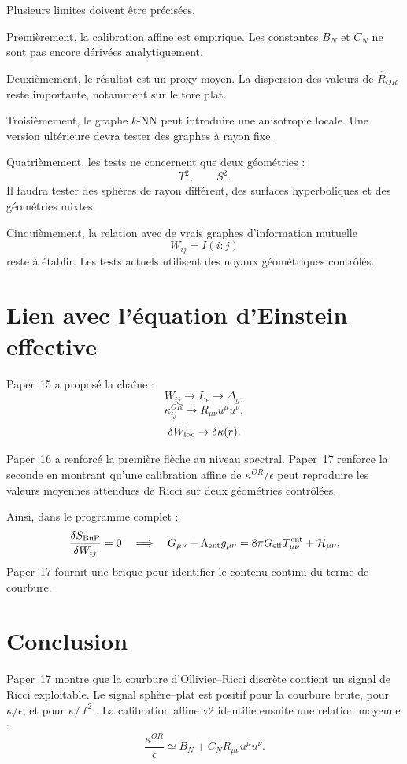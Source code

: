 \documentclass[11pt,a4paper]{article}
\begin{document}
Plusieurs limites doivent être précisées.

Premièrement, la calibration affine est empirique. Les constantes \(B_N\) et
\(C_N\) ne sont pas encore dérivées analytiquement.

Deuxièmement, le résultat est un proxy moyen. La dispersion des valeurs de
\(\widehat{R}_{OR}\) reste importante, notamment sur le tore plat.

Troisièmement, le graphe \(k\)-NN peut introduire une anisotropie locale. Une
version ultérieure devra tester des graphes à rayon fixe.

Quatrièmement, les tests ne concernent que deux géométries :
\[
T^2,
\qquad
S^2.
\]
Il faudra tester des sphères de rayon différent, des surfaces hyperboliques et
des géométries mixtes.

Cinquièmement, la relation avec de vrais graphes d'information mutuelle
\[
W_{ij}=I(i:j)
\]
reste à établir. Les tests actuels utilisent des noyaux géométriques
contrôlés.

\section{Lien avec l'équation d'Einstein effective}

Paper~15 a proposé la chaîne :
\[
W_{ij}
\to
L_\epsilon
\to
\Delta_g,
\]
\[
\kappa_{ij}^{OR}
\to
R_{\mu\nu}u^\mu u^\nu,
\]
\[
\delta W_{\rm loc}
\to
\delta\kappa(r).
\]

Paper~16 a renforcé la première flèche au niveau spectral. Paper~17 renforce
la seconde en montrant qu'une calibration affine de \(\kappa^{OR}/\epsilon\)
peut reproduire les valeurs moyennes attendues de Ricci sur deux géométries
contrôlées.

Ainsi, dans le programme complet :
\[
\frac{\delta S_{\rm BuP}}{\delta W_{ij}}=0
\quad
\Longrightarrow
\quad
G_{\mu\nu}
+
\Lambda_{\rm ent}g_{\mu\nu}
=
8\pi G_{\rm eff}T_{\mu\nu}^{\rm ent}
+
\mathcal{H}_{\mu\nu},
\]
Paper~17 fournit une brique pour identifier le contenu continu du terme de
courbure.

\section{Conclusion}

Paper~17 montre que la courbure d'Ollivier--Ricci discrète contient un signal
de Ricci exploitable. Le signal sphère--plat est positif pour la courbure
brute, pour \(\kappa/\epsilon\), et pour \(\kappa/\ell^2\). La calibration
affine v2 identifie ensuite une relation moyenne :
\[
\frac{\kappa^{OR}}{\epsilon}
\simeq
B_N+C_N R_{\mu\nu}u^\mu u^\nu.
\]
\end{document}
